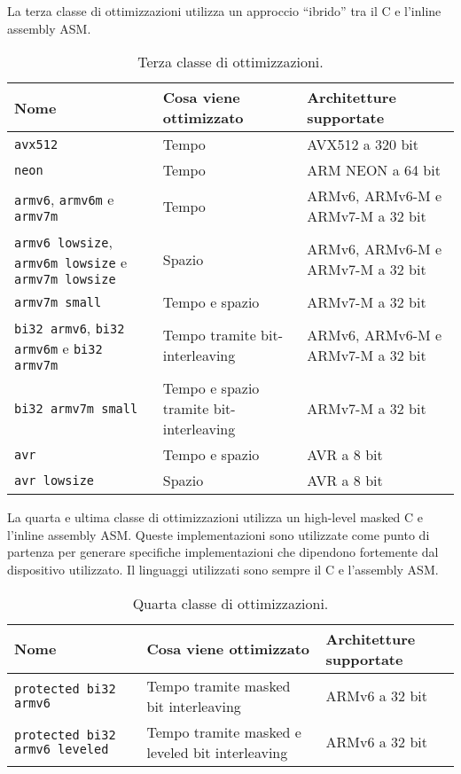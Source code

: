 \noindent La terza classe di ottimizzazioni utilizza un approccio ``ibrido'' tra il C e l'inline assembly ASM\cite{github}.

\begin{table}[H]
    \centering
	\begin{tabular}{|m{}<{\centering}||m{}<{\centering}|m{}<{\centering}|}
		\hline
		\textbf{Nome} & \textbf{Cosa viene ottimizzato} & \textbf{Architetture supportate} \\
        \hline \hline
        \texttt{avx512} & Tempo & AVX512 a 320 bit \\
        \hline
        \texttt{neon} & Tempo & ARM NEON a 64 bit \\
        \hline
        \texttt{armv6}, \texttt{armv6m} e \texttt{armv7m} & Tempo & ARMv6, ARMv6-M e ARMv7-M a 32 bit \\
        \hline
        \texttt{armv6 lowsize}, \texttt{armv6m lowsize} e \texttt{armv7m lowsize} & Spazio & ARMv6, ARMv6-M e ARMv7-M a 32 bit \\
        \hline
        \texttt{armv7m small} & Tempo e spazio & ARMv7-M a 32 bit \\
        \hline
        \texttt{bi32 armv6}, \texttt{bi32 armv6m} e \texttt{bi32 armv7m} & Tempo tramite bit-interleaving & ARMv6, ARMv6-M e ARMv7-M a 32 bit \\
        \hline
        \texttt{bi32 armv7m small} & Tempo e spazio tramite bit-interleaving & ARMv7-M a 32 bit \\
        \hline
        \texttt{avr} & Tempo e spazio & AVR a 8 bit \\
        \hline
        \texttt{avr lowsize} & Spazio & AVR a 8 bit \\
        \hline
    \end{tabular}
    \caption{Terza classe di ottimizzazioni.}
\end{table}

\noindent La quarta e ultima classe di ottimizzazioni utilizza un high-level masked C e l'inline assembly ASM\cite{github}. Queste implementazioni sono utilizzate come punto di partenza per generare specifiche implementazioni che dipendono fortemente dal dispositivo utilizzato. Il linguaggi utilizzati sono sempre il C e l'assembly ASM.

\begin{table}[H]
    \centering
	\begin{tabular}{|m{}<{\centering}||m{}<{\centering}|m{}<{\centering}|}
		\hline
		\textbf{Nome} & \textbf{Cosa viene ottimizzato} & \textbf{Architetture supportate} \\
        \hline \hline
        \texttt{protected bi32 armv6} & Tempo tramite masked bit interleaving & ARMv6 a 32 bit \\
        \hline
        \texttt{protected bi32 armv6 leveled} & Tempo tramite masked e leveled bit interleaving & ARMv6 a 32 bit \\
        \hline
    \end{tabular}
    \caption{Quarta classe di ottimizzazioni.}
\end{table}
